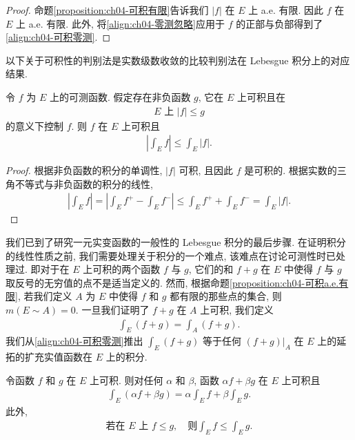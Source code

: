 \documentclass[../../main.tex]{subfiles}
\begin{document}
\begin{proof}
命题\cref{proposition:ch04-可积有限}告诉我们 $|f|$ 在 $E$ 上 a.e. 有限. 因此 $f$ 在 $E$ 上 a.e. 有限. 此外, 将\eqref{align:ch04-零测忽略}应用于 $f$ 的正部与负部得到了\eqref{align:ch04-可积零测}.
\end{proof}

以下关于可积性的判别法是实数级数收敛的比较判别法在 Lebesgue 积分上的对应结果.

\begin{proposition}[积分的比较判别法]\label{proposition:ch04-比较判别}
令 $f$ 为 $E$ 上的可测函数. 假定存在非负函数 $g$, 它在 $E$ 上可积且在
\begin{align*}
E\text{ 上 }|f|\leqslant g
\end{align*}
的意义下控制 $f$. 则 $f$ 在 $E$ 上可积且
\begin{align*}
\left|\int_{E}f\right|\leqslant\int_{E}|f|.
\end{align*}
\end{proposition}

\begin{proof}
根据非负函数的积分的单调性, $|f|$ 可积, 且因此 $f$ 是可积的. 根据实数的三角不等式与非负函数的积分的线性,
\begin{align*}
\left|\int_{E}f\right|=\left|\int_{E}f^{+}-\int_{E}f^{-}\right|\leqslant\int_{E}f^{+}+\int_{E}f^{-}=\int_{E}|f|.
\end{align*}
\end{proof}

我们已到了研究一元实变函数的一般性的 Lebesgue 积分的最后步骤. 在证明积分的线性性质之前, 我们需要处理关于积分的一个难点, 该难点在讨论可测性时已处理过. 即对于在 $E$ 上可积的两个函数 $f$ 与 $g$, 它们的和 $f+g$ 在 $E$ 中使得 $f$ 与 $g$ 取反号的无穷值的点不是适当定义的. 然而, 根据命题\cref{proposition:ch04-可积a.e.有限}, 若我们定义 $A$ 为 $E$ 中使得 $f$ 和 $g$ 都有限的那些点的集合, 则 $m(E\sim A)=0$. 一旦我们证明了 $f+g$ 在 $A$ 上可积, 我们定义
\begin{align*}
\int_{E}(f+g)=\int_{A}(f+g).
\end{align*}
我们从\eqref{align:ch04-可积零测}推出 $\int_{E}(f+g)$ 等于任何 $(f+g)|_{A}$ 在 $E$ 上的延拓的扩充实值函数在 $E$ 上的积分.

\begin{theorem}[积分的线性与单调性]\label{theorem:ch04-一般线性}
令函数 $f$ 和 $g$ 在 $E$ 上可积. 则对任何 $\alpha$ 和 $\beta$, 函数 $\alpha f+\beta g$ 在 $E$ 上可积且
\begin{align*}
\int_{E}(\alpha f+\beta g)=\alpha\int_{E}f+\beta\int_{E}g.
\end{align*}
此外,
\begin{align*}
\text{若在 }E\text{ 上 }f\leqslant g,\quad\text{则}\int_{E}f\leqslant\int_{E}g.
\end{align*}
\end{theorem}
\end{document}
